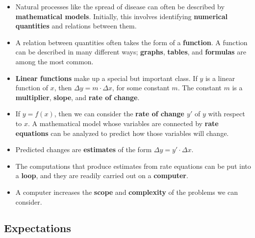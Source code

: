 \begin{itemize}

\item Natural processes like the spread of disease can often be
  described by {\bf mathematical models}.  Initially, this involves
  identifying {\bf numerical quantities} and relations between them.

\item A relation between quantities often takes the form of a {\bf
  function}.  A function can be described in many different ways; {\bf
  graphs}, {\bf tables}, and {\bf formulas} are among the most common.

\item {\bf Linear functions} make up a special but important class.
  If $y$ is a linear function of $x$, then {\bf \boldmath $\Delta y =
    m\cdot\Delta x$}, for some constant $m$.  The constant $m$ is a
  {\bf multiplier}, {\bf slope}, and {\bf rate of change}.

\item If $y = f(x)$, then we can consider the {\bf rate of change
  \boldmath $y'$} of $y$ with respect to $x$.  A mathematical model
  whose variables are connected by {\bf rate equations} can be
  analyzed to predict how those variables will change.

\item Predicted changes are {\bf estimates} of the form {\bf \boldmath
  $\Delta y = y'\cdot\Delta x$}.

\item The computations that produce estimates from rate equations can
  be put into a {\bf loop}, and they are readily carried out on a {\bf
    computer}.

\item A computer increases the {\bf scope} and {\bf complexity} of the
  problems we can consider.


\end{itemize}

\subsection{Expectations}
\label{subsec:expectations}

